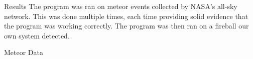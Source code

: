 \documentclass[final]{beamer}
\newlength{\twocolwid}
\begin{document}
\begin{frame}[t]
\begin{columns}[t]
\begin{column}{\twocolwid}









\begin{block}{Results}
The program was ran on meteor events collected by NASA's all-sky network. This was done multiple times, each time providing solid evidence that the program was working correctly. The program was then ran on a fireball our own system detected.
\end{block}

\begin{alertblock}{Meteor Data}


\end{alertblock}
\end{column}
\end{columns}
\end{frame}
\end{document}

